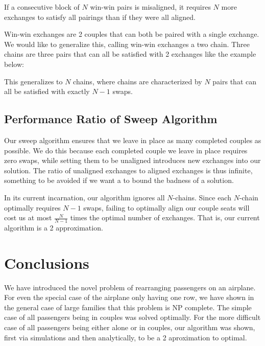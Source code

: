\documentclass[11pt,twocolumn]{article}
\begin{document}
\begin{cor} \label{cor:winWinAsBlocks}
If a consecutive block of $N$ win-win pairs is misaligned, it requires $N$ more exchanges to satisfy all pairings than if they were all aligned.
\end{cor}

Win-win exchanges are 2 couples that can both be paired with a single exchange.  We would like to generalize this, calling win-win exchanges a two chain.  Three chains are three pairs that can all be satisfied with 2 exchanges like the example below:

\begin{figure}[H]
\centering
{}
\end{figure}

This generalizes to $N$ chains, where chains are characterized by $N$ pairs that can all be satisfied with exactly $N-1$ swaps.

\subsection{Performance Ratio of Sweep Algorithm}

Our sweep algorithm ensures that we leave in place as many completed couples as possible. We do this because each completed couple we leave in place requires zero swaps, while setting them to be unaligned introduces new exchanges into our solution.  The ratio of unaligned exchanges to aligned exchanges is thus infinite, something to be avoided if we want a to bound the badness of a solution.

In its current incarnation, our algorithm ignores all $N$-chains.  Since each $N$-chain optimally requires $N-1$ swaps, failing to optimally align our couple seats will cost us at most $\frac{N}{N-1}$ times the optimal number of exchanges.  That is, our current algorithm is a 2 approximation.

\section{Conclusions}

We have introduced the novel problem of rearranging passengers on an airplane.  For even the special case of the airplane only having one row, we have shown in the general case of large families that this problem is NP complete.  The simple case of all passengers being in couples was solved optimally. For the more difficult case of all passengers being either alone or in couples, our algorithm was shown, first via simulations and then analytically, to be a 2 aproximation to optimal.
\end{document}
